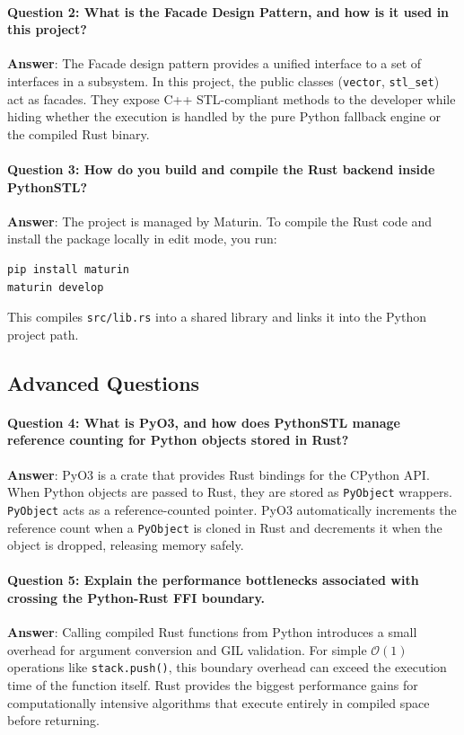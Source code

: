 \documentclass[11pt,a4paper]{article}
\begin{document}
\paragraph{Question 2: What is the Facade Design Pattern, and how is it used in this project?}
\textbf{Answer}: The Facade design pattern provides a unified interface to a set of interfaces in a subsystem. In this project, the public classes (\texttt{vector}, \texttt{stl\_set}) act as facades. They expose C++ STL-compliant methods to the developer while hiding whether the execution is handled by the pure Python fallback engine or the compiled Rust binary.

\paragraph{Question 3: How do you build and compile the Rust backend inside PythonSTL?}
\textbf{Answer}: The project is managed by Maturin. To compile the Rust code and install the package locally in edit mode, you run:
\begin{lstlisting}[language=bash]
pip install maturin
maturin develop
\end{lstlisting}
This compiles \texttt{src/lib.rs} into a shared library and links it into the Python project path.

\subsection{Advanced Questions}

\paragraph{Question 4: What is PyO3, and how does PythonSTL manage reference counting for Python objects stored in Rust?}
\textbf{Answer}: PyO3 is a crate that provides Rust bindings for the CPython API. When Python objects are passed to Rust, they are stored as \texttt{PyObject} wrappers. \texttt{PyObject} acts as a reference-counted pointer. PyO3 automatically increments the reference count when a \texttt{PyObject} is cloned in Rust and decrements it when the object is dropped, releasing memory safely.

\paragraph{Question 5: Explain the performance bottlenecks associated with crossing the Python-Rust FFI boundary.}
\textbf{Answer}: Calling compiled Rust functions from Python introduces a small overhead for argument conversion and GIL validation. For simple $\mathcal{O}(1)$ operations like \texttt{stack.push()}, this boundary overhead can exceed the execution time of the function itself. Rust provides the biggest performance gains for computationally intensive algorithms that execute entirely in compiled space before returning.
\end{document}
